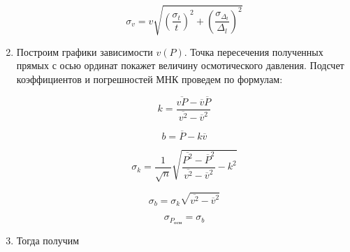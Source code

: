 \documentclass[a4paper, 12pt]{article}%
\begin{document}
\begin{enumerate}
	\begin{equation}
 \sigma_v = v \sqrt{\left(\frac{\sigma_t}{t}\right)^2 + \left(\frac{\sigma_{\Delta_l}}{\Delta_l}\right)^2 } 
\end{equation}

	
	\item Построим графики зависимости $ v(P) $. Точка пересечения полученных прямых с осью ординат покажет величину осмотического давления. Подсчет коэффициентов и погрешностей МНК проведем по формулам: 
	
\begin{equation}
	 k = \frac{\overline{vP} - \overline v  \overline P}{\overline{v^2} - \overline v ^2} 
\end{equation}
	
	\begin{equation}
		 b = \overline P - k \overline v 
	\end{equation}
	
	\begin{equation}
		 \sigma_k = \frac{1}{\sqrt n} \sqrt{\frac{\overline{P^2} - \overline P ^2}{\overline{v^2} - \overline v ^2} - k^2} 
	\end{equation}
	
	
	\begin{equation}
		 \sigma_b = \sigma_k \sqrt{\overline{v^2} - \overline v ^2} 
	\end{equation}

	
	\begin{equation} 
		\sigma_{P_{\text{осм}}} = \sigma_b
	\end{equation}
	
	\item Тогда получим 
	
	
	\begin{figure}[H]
	\end{figure}



\end{enumerate}
\end{document}
